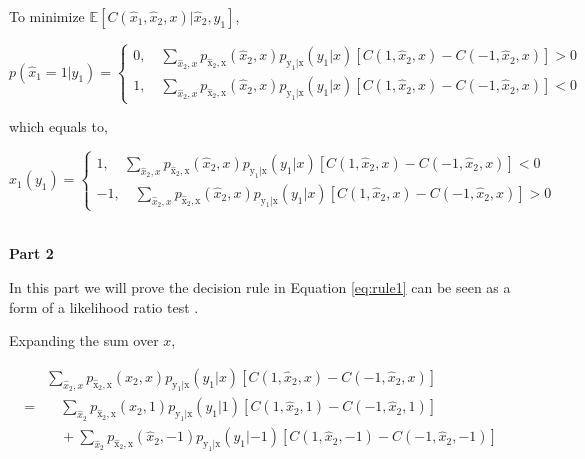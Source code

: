\documentclass[a4paper]{article}
\begin{document}
\begin{enumerate}
\begin{enumerate}
To minimize $ \mathbb{E}\left[ C(\hat{x}_1,\hat x_2, x) | \hat x_2,y_1  \right]$, 

\begin{equation}
  p(\hat x_1 = 1|y_1) = \left\{ \begin{aligned}
    0, \quad \sum_{\hat x_2,x} p_{\hat{\mathrm{x}}_2,\mathrm{x}}(\hat x_2,x) p_{\mathrm{y}_1 | \mathrm{x}}(y_1|x)\left[C(1,\hat{x}_2,x)-C(-1,\hat{x}_2,x) \right] > 0 \\
    1, \quad\sum_{\hat x_2,x} p_{\hat{\mathrm{x}}_2,\mathrm{x}}(\hat x_2,x) p_{\mathrm{y}_1 | \mathrm{x}}(y_1|x)\left[C(1,\hat{x}_2,x)-C(-1,\hat{x}_2,x) \right] < 0
  \end{aligned}
  \right.
\end{equation}

which equals to,

\begin{equation}\label{eq:rule1}
    \hat x_1(y_1)= \left\{ \begin{aligned}
    1, \quad \sum_{\hat x_2,x} p_{\hat{\mathrm{x}}_2,\mathrm{x}}(\hat x_2,x) p_{\mathrm{y}_1 | \mathrm{x}}(y_1|x)\left[C(1,\hat{x}_2,x)-C(-1,\hat{x}_2,x) \right] < 0 \\
    -1, \quad \sum_{\hat x_2,x} p_{\hat{\mathrm{x}}_2,\mathrm{x}}(\hat x_2,x) p_{\mathrm{y}_1 | \mathrm{x}}(y_1|x)\left[C(1,\hat{x}_2,x)-C(-1,\hat{x}_2,x) \right] > 0
  \end{aligned}
  \right.
\end{equation}

~\\

\textbf{Part 2}

In this part we will prove the decision rule in Equation \ref{eq:rule1} can be seen as a form of a likelihood ratio test .

Expanding the sum over $x$,

\begin{equation}
  \begin{aligned}
    &\sum_{\hat x_2,x} p_{\hat{\mathrm{x}}_2,\mathrm{x}}(\hat x_2,x) p_{\mathrm{y}_1 | \mathrm{x}}(y_1|x)\left[C(1,\hat{x}_2,x)-C(-1,\hat{x}_2,x) \right] \\ = & \quad \sum_{\hat x_2} p_{\hat{\mathrm{x}}_2,\mathrm{x}}(\hat x_2,1) p_{\mathrm{y}_1 | \mathrm{x}}(y_1|1)\left[C(1,\hat{x}_2,1)-C(-1,\hat{x}_2,1) \right] \\ & \quad + \sum_{\hat x_2} p_{\hat{\mathrm{x}}_2,\mathrm{x}}(\hat x_2,-1) p_{\mathrm{y}_1 | \mathrm{x}}(y_1|-1)\left[C(1,\hat{x}_2,-1)-C(-1,\hat{x}_2,-1) \right]
  \end{aligned}
\end{equation}


\end{enumerate}
\end{enumerate}
\end{document}
